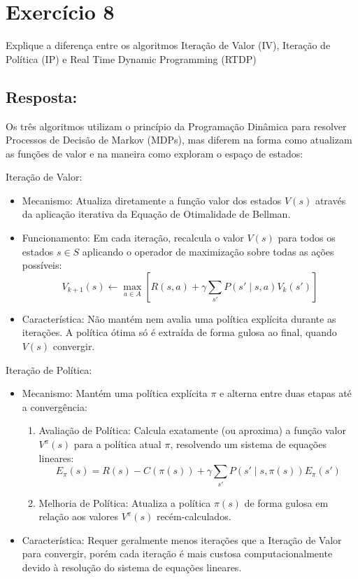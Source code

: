 \documentclass[a4paper,12pt]{article}
\begin{document}
\section*{Exercício 8}

Explique a diferença entre os algoritmos Iteração de Valor (IV), Iteração de Política (IP) e Real Time Dynamic Programming (RTDP)


\subsection*{Resposta:}

\bigskip


Os três algoritmos utilizam o princípio da Programação Dinâmica para resolver Processos de Decisão de Markov (MDPs), mas diferem na forma como atualizam as funções de valor e na maneira como exploram o espaço de estados:

Iteração de Valor:\\
\begin{itemize}
	\item Mecanismo: Atualiza diretamente a função valor dos estados $V(s)$ através da aplicação iterativa da Equação de Otimalidade de Bellman.
	\item Funcionamento: Em cada iteração, recalcula o valor $V(s)$ para todos os estados $s \in S$ aplicando o operador de maximização sobre todas as ações possíveis:
	\[
	V_{k+1}(s) \leftarrow \max_{a \in A} \left[ R(s,a) + \gamma \sum_{s'} P(s' \mid s, a) V_k(s') \right]
	\]
	\item Característica: Não mantém nem avalia uma política explícita durante as iterações. A política ótima só é extraída de forma gulosa ao final, quando $V(s)$ convergir.\\
\end{itemize}

Iteração de Política:\\
\begin{itemize}
	\item Mecanismo: Mantém uma política explícita $\pi$ e alterna entre duas etapas até a convergência:
	\begin{enumerate}
		\item Avaliação de Política: Calcula exatamente (ou aproxima) a função valor $V^\pi(s)$ para a política atual $\pi$, resolvendo um sistema de equações lineares:
		\[
		E_\pi(s) = R(s) - C(\pi(s)) + \gamma \sum_{s'} P(s' \mid s, \pi(s)) E_\pi(s')
		\]
		\item Melhoria de Política: Atualiza a política $\pi(s)$ de forma gulosa em relação aos valores $V^\pi(s)$ recém-calculados.
	\end{enumerate}
	\item Característica: Requer geralmente menos iterações que a Iteração de Valor para convergir, porém cada iteração é mais custosa computacionalmente devido à resolução do sistema de equações lineares.\\
\end{itemize}
\end{document}
